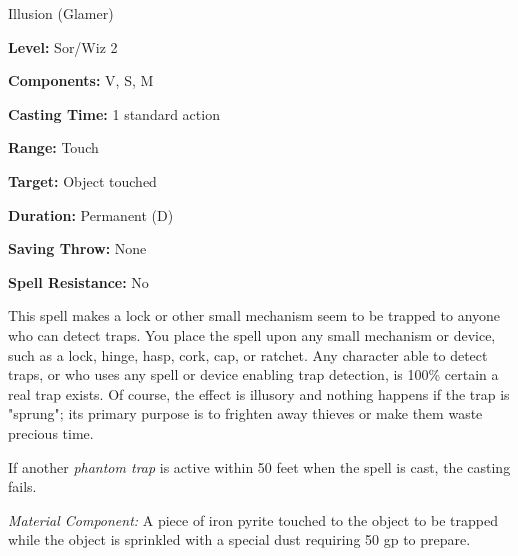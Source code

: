 
Illusion (Glamer)

\textbf{Level:} Sor/Wiz 2

\textbf{Components:} V, S, M

\textbf{Casting Time:} 1 standard action

\textbf{Range:} Touch

\textbf{Target:} Object touched

\textbf{Duration:} Permanent (D)

\textbf{Saving Throw:} None

\textbf{Spell Resistance:} No

This spell makes a lock or other small mechanism seem to be trapped to anyone who 
can detect traps. You place the spell upon any small mechanism or device, such 
as a lock, hinge, hasp, cork, cap, or ratchet. Any character able to detect traps, 
or who uses any spell or device enabling trap detection, is 100\% certain a real 
trap exists. Of course, the effect is illusory and nothing happens if the trap 
is "sprung"; its primary purpose is to frighten away thieves or make them waste 
precious time.

If another \textit{phantom trap} is active within 50 feet when the spell is cast, 
the casting fails.

\textit{Material Component:} A piece of iron pyrite touched to the object to be 
trapped while the object is sprinkled with a special dust requiring 50 gp to prepare.

